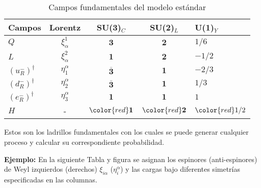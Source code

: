 \begin{frame}
\begin{table}
  \centering
    \begin{tabular}{|l|c|c|c|l|}\hline
      Campos               &Lorentz   & SU(3)$_{C}$            & SU(2)$_{L}$           & U(1)$_Y$          \\\hline
    $Q   $                 & $\xi_{\alpha}^1$ & $\mathbf{3}$           & $\mathbf{2}$          & $1/6$          \\      
    $L   $                 & $\xi_{\alpha}^2$ & $\mathbf{1}$           & $\mathbf{2}$          & $-1/2$          \\
    $\left(u_R^{-}\right)^{\dagger}$ & $\eta_1^\alpha$  & $\overline{\mathbf{3}}$ & $\mathbf{1}$           & $-2/3$              \\
    $\left(d_R^{-}\right)^{\dagger}$ & $\eta_2^\alpha$  & $\overline{\mathbf{3}}$ & $\mathbf{1}$           & $1/3$              \\            
    $\left(e_R^{-}\right)^{\dagger}$ & $\eta_3^\alpha$  & $\mathbf{1}$            & $\mathbf{1}$            & $1$              \\
     $H$                   & -       &  $\color{red}\mathbf{1}$ & $\color{red}\mathbf{2}$ &$\color{red}1/2$\\\hline
  \end{tabular}\hspace{1cm} 
  \caption{Campos fundamentales del modelo estándar }
  \label{tab:smflds}
\end{table}
\end{frame}

Estos son los ladrillos fundamentales con los cuales se puede generar cualquier proceso y calcular su correspondiente probabilidad.


\noindent
\textbf{Ejemplo:} 
En la siguiente Tabla y figura se asignan los espinores (anti-espinores) de Weyl izquierdos (derechos) $\xi_{i\alpha}$ ($\eta^{\alpha}_i$)  y las cargas bajo diferentes simetrías especificadas en las columnas.



